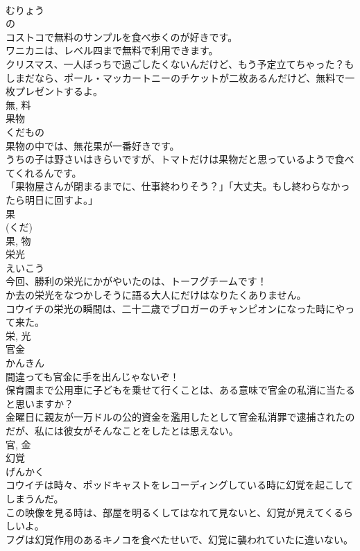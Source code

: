 \documentclass[8pt]{extreport}
\begin{document}
\begin{CJK}{UTF8}{min}
\\	むりょう	
\\	の 
\\	コストコで無料のサンプルを食べ歩くのが好きです。	
\\	ワニカニは、レベル四まで無料で利用できます。	
\\	クリスマス、一人ぼっちで過ごしたくないんだけど、もう予定立てちゃった？もしまだなら、ポール・マッカートニーのチケットが二枚あるんだけど、無料で一枚プレゼントするよ。	
\\	無, 料	
\\	果物	
\\	くだもの	
\\	果物の中では、無花果が一番好きです。	
\\	うちの子は野さいはきらいですが、トマトだけは果物だと思っているようで食べてくれるんです。	
\\	「果物屋さんが閉まるまでに、仕事終わりそう？」「大丈夫。もし終わらなかったら明日に回すよ。」	
\\	果 
\\	(くだ) 
\\	果, 物	
\\	栄光	
\\	えいこう	
\\	今回、勝利の栄光にかがやいたのは、トーフグチームです！	
\\	か去の栄光をなつかしそうに語る大人にだけはなりたくありません。	
\\	コウイチの栄光の瞬間は、二十二歳でブロガーのチャンピオンになった時にやって来た。	
\\	栄, 光	
\\	官金	
\\	かんきん	
\\	間違っても官金に手を出んじゃないぞ！	
\\	保育園まで公用車に子どもを乗せて行くことは、ある意味で官金の私消に当たると思いますか？	
\\	金曜日に親友が一万ドルの公的資金を濫用したとして官金私消罪で逮捕されたのだが、私には彼女がそんなことをしたとは思えない。	
\\	官, 金	
\\	幻覚	
\\	げんかく	
\\	コウイチは時々、ポッドキャストをレコーディングしている時に幻覚を起こしてしまうんだ。	
\\	この映像を見る時は、部屋を明るくしてはなれて見ないと、幻覚が見えてくるらしいよ。	
\\	フグは幻覚作用のあるキノコを食べたせいで、幻覚に襲われていたに違いない。	

\end{CJK}
\end{document}

